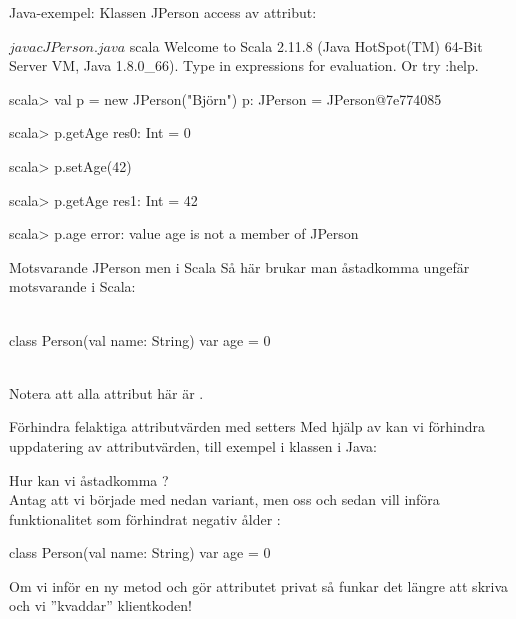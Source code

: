 \begin{Slide}{Java-exempel: Klassen JPerson}\SlideFontSmall
{} access av  attribut:
\vspace{-1em}\begin{multicols}{2}

\columnbreak

\begin{REPLnonum}[basicstyle=\SlideFontSize{7}{9}\ttfamily\color{white}]
$ javac JPerson.java
$ scala
Welcome to Scala 2.11.8 (Java HotSpot(TM) 64-Bit Server VM, Java 1.8.0_66).
Type in expressions for evaluation. Or try :help.

scala> val p = new JPerson("Björn")
p: JPerson = JPerson@7e774085

scala> p.getAge
res0: Int = 0

scala> p.setAge(42)

scala> p.getAge
res1: Int = 42

scala> p.age
error:
value age is not a member of JPerson
\end{REPLnonum}
\end{multicols}
\end{Slide}


\begin{Slide}{Motsvarande JPerson men i Scala}
Så här brukar man åstadkomma ungefär motsvarande i Scala: \\~
\begin{Code}[basicstyle=\SlideFontSize{13}{15}\ttfamily\selectfont]
class Person(val name: String) {
  var age = 0
}
\end{Code}
~\\
Notera att alla attribut här är .
\end{Slide}


\begin{Slide}{Förhindra felaktiga attributvärden med setters}\SlideFontSmall
Med hjälp av  kan vi förhindra  uppdatering av attributvärden, till exempel  i klassen  i Java:
\begin{Code}[language=Java]
    public void setAge(int age){
        if (age >= 0) {
            this.age = age;
        else {
            this.age = 0;
        }
    }
\end{Code}
Hur kan vi åstadkomma ? \\
\pause
Antag att vi började med nedan variant, men  oss och sedan vill införa funktionalitet som förhindrat negativ ålder :
\begin{Code}
class Person(val name: String) {
  var age = 0
}
\end{Code}
Om vi inför en ny metod  och gör attributet  privat så funkar det  längre att skriva   och vi ''kvaddar'' klientkoden! \code{  :(}
\end{Slide}



